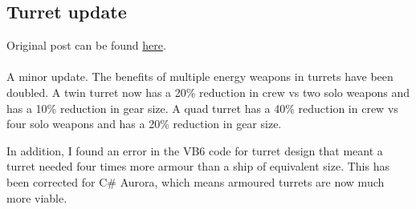 \documentclass[../../Aurora C# unofficial manual.tex]{subfiles}
\begin{document}
	\subsection{Turret update}
	Original post can be found
	\href{http://aurora2.pentarch.org/index.php?topic=8495.msg103323#msg103323}{here}.
	\\\\
	
	A minor update. The benefits of multiple energy weapons in turrets have been doubled. A twin turret now has a 20\% reduction in crew vs two solo weapons and has a 10\% reduction in gear size. A quad turret has a 40\% reduction in crew vs four solo weapons and has a 20\% reduction in gear size.
	
	In addition, I found an error in the VB6 code for turret design that meant a turret needed four times more armour than a ship of equivalent size. This has been corrected for C\# Aurora, which means armoured turrets are now much more viable.
\end{document}
